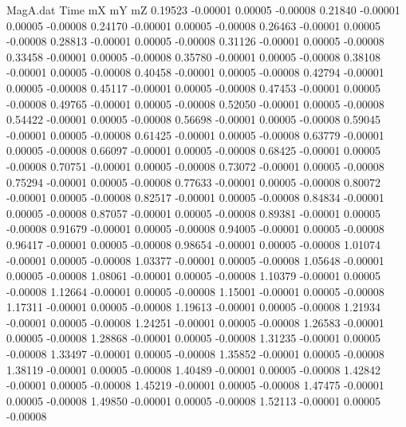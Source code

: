 \begin{filecontents}{MagA.dat}
Time mX mY mZ
   0.19523   -0.00001    0.00005   -0.00008
   0.21840   -0.00001    0.00005   -0.00008
   0.24170   -0.00001    0.00005   -0.00008
   0.26463   -0.00001    0.00005   -0.00008
   0.28813   -0.00001    0.00005   -0.00008
   0.31126   -0.00001    0.00005   -0.00008
   0.33458   -0.00001    0.00005   -0.00008
   0.35780   -0.00001    0.00005   -0.00008
   0.38108   -0.00001    0.00005   -0.00008
   0.40458   -0.00001    0.00005   -0.00008
   0.42794   -0.00001    0.00005   -0.00008
   0.45117   -0.00001    0.00005   -0.00008
   0.47453   -0.00001    0.00005   -0.00008
   0.49765   -0.00001    0.00005   -0.00008
   0.52050   -0.00001    0.00005   -0.00008
   0.54422   -0.00001    0.00005   -0.00008
   0.56698   -0.00001    0.00005   -0.00008
   0.59045   -0.00001    0.00005   -0.00008
   0.61425   -0.00001    0.00005   -0.00008
   0.63779   -0.00001    0.00005   -0.00008
   0.66097   -0.00001    0.00005   -0.00008
   0.68425   -0.00001    0.00005   -0.00008
   0.70751   -0.00001    0.00005   -0.00008
   0.73072   -0.00001    0.00005   -0.00008
   0.75294   -0.00001    0.00005   -0.00008
   0.77633   -0.00001    0.00005   -0.00008
   0.80072   -0.00001    0.00005   -0.00008
   0.82517   -0.00001    0.00005   -0.00008
   0.84834   -0.00001    0.00005   -0.00008
   0.87057   -0.00001    0.00005   -0.00008
   0.89381   -0.00001    0.00005   -0.00008
   0.91679   -0.00001    0.00005   -0.00008
   0.94005   -0.00001    0.00005   -0.00008
   0.96417   -0.00001    0.00005   -0.00008
   0.98654   -0.00001    0.00005   -0.00008
   1.01074   -0.00001    0.00005   -0.00008
   1.03377   -0.00001    0.00005   -0.00008
   1.05648   -0.00001    0.00005   -0.00008
   1.08061   -0.00001    0.00005   -0.00008
   1.10379   -0.00001    0.00005   -0.00008
   1.12664   -0.00001    0.00005   -0.00008
   1.15001   -0.00001    0.00005   -0.00008
   1.17311   -0.00001    0.00005   -0.00008
   1.19613   -0.00001    0.00005   -0.00008
   1.21934   -0.00001    0.00005   -0.00008
   1.24251   -0.00001    0.00005   -0.00008
   1.26583   -0.00001    0.00005   -0.00008
   1.28868   -0.00001    0.00005   -0.00008
   1.31235   -0.00001    0.00005   -0.00008
   1.33497   -0.00001    0.00005   -0.00008
   1.35852   -0.00001    0.00005   -0.00008
   1.38119   -0.00001    0.00005   -0.00008
   1.40489   -0.00001    0.00005   -0.00008
   1.42842   -0.00001    0.00005   -0.00008
   1.45219   -0.00001    0.00005   -0.00008
   1.47475   -0.00001    0.00005   -0.00008
   1.49850   -0.00001    0.00005   -0.00008
   1.52113   -0.00001    0.00005   -0.00008

\end{filecontents}

